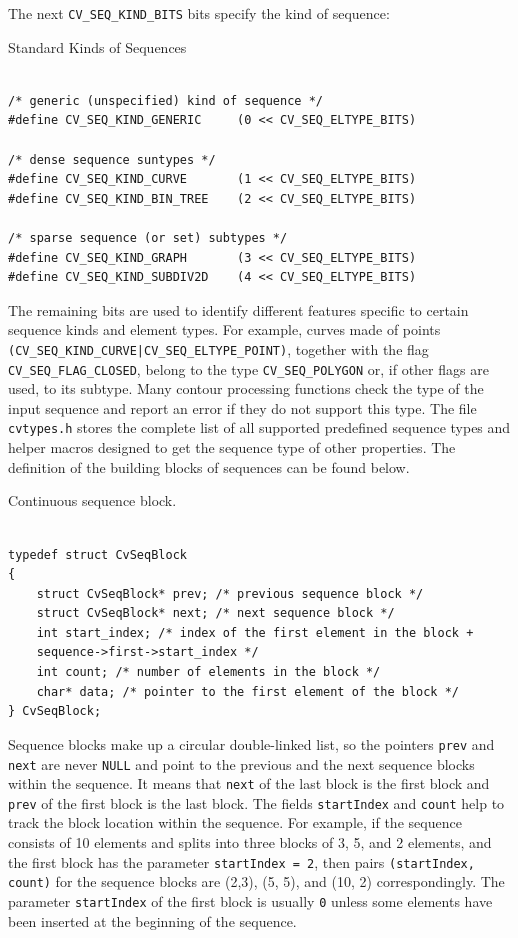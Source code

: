 The next \texttt{CV\_SEQ\_KIND\_BITS} bits specify the kind of sequence:

Standard Kinds of Sequences

\begin{lstlisting}

/* generic (unspecified) kind of sequence */
#define CV_SEQ_KIND_GENERIC     (0 << CV_SEQ_ELTYPE_BITS)

/* dense sequence suntypes */
#define CV_SEQ_KIND_CURVE       (1 << CV_SEQ_ELTYPE_BITS)
#define CV_SEQ_KIND_BIN_TREE    (2 << CV_SEQ_ELTYPE_BITS)

/* sparse sequence (or set) subtypes */
#define CV_SEQ_KIND_GRAPH       (3 << CV_SEQ_ELTYPE_BITS)
#define CV_SEQ_KIND_SUBDIV2D    (4 << CV_SEQ_ELTYPE_BITS)

\end{lstlisting}

The remaining bits are used to identify different features specific
to certain sequence kinds and element types. For example, curves
made of points \texttt{(CV\_SEQ\_KIND\_CURVE|CV\_SEQ\_ELTYPE\_POINT)},
together with the flag \texttt{CV\_SEQ\_FLAG\_CLOSED}, belong to the
type \texttt{CV\_SEQ\_POLYGON} or, if other flags are used, to its
subtype. Many contour processing functions check the type of the input
sequence and report an error if they do not support this type. The
file \texttt{cvtypes.h} stores the complete list of all supported
predefined sequence types and helper macros designed to get the sequence
type of other properties. The definition of the building
blocks of sequences can be found below.

\label{CvSeqBlock}

Continuous sequence block.

\begin{lstlisting}

typedef struct CvSeqBlock
{
    struct CvSeqBlock* prev; /* previous sequence block */
    struct CvSeqBlock* next; /* next sequence block */
    int start_index; /* index of the first element in the block +
    sequence->first->start_index */
    int count; /* number of elements in the block */
    char* data; /* pointer to the first element of the block */
} CvSeqBlock;

\end{lstlisting}

Sequence blocks make up a circular double-linked list, so the pointers
\texttt{prev} and \texttt{next} are never \texttt{NULL} and point to the
previous and the next sequence blocks within the sequence. It means that
\texttt{next} of the last block is the first block and \texttt{prev} of
the first block is the last block. The fields \texttt{startIndex} and
\texttt{count} help to track the block location within the sequence. For
example, if the sequence consists of 10 elements and splits into three
blocks of 3, 5, and 2 elements, and the first block has the parameter
\texttt{startIndex = 2}, then pairs \texttt{(startIndex, count)} for the sequence
blocks are
(2,3), (5, 5), and (10, 2)
correspondingly. The parameter
\texttt{startIndex} of the first block is usually \texttt{0} unless
some elements have been inserted at the beginning of the sequence.

